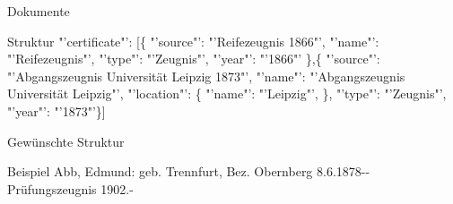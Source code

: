 \documentclass[12pt]{beamer}
\begin{document}
\begin{large}
\begin{frame}{Dokumente}
 \begin{block}{Struktur}
  \normalsize
  \hspace*{0.5cm} 
  "'certificate"': [\{
\newline 
\hspace*{1cm}"'source"': "'Reifezeugnis 1866"',
\newline 
\hspace*{1cm}"'name"': "'Reifezeugnis"',
\newline 
\hspace*{1cm}"'type"': "'Zeugnis"',
\newline 
\hspace*{1cm}"'year"': "'1866"'
\newline 
\hspace*{0.5cm}\},\{
\newline 
\hspace*{1cm}"'source"': "'Abgangszeugnis Universität Leipzig 1873"',
\newline 
\hspace*{1cm}"'name"': "'Abgangszeugnis Universität Leipzig"',
\newline 
\hspace*{1cm}"'location"': \{
\newline 
\hspace*{1cm}\hspace*{0.5cm}"'name"': "'Leipzig"',
\newline 
\hspace*{1cm}\},
\newline 
\hspace*{1cm}"'type"': "'Zeugnis"',
\newline 
\hspace*{1cm}"'year"': "'1873"'\}]
 \end{block} 
\end{frame}


\begin{frame}{Gewünschte Struktur}
 \begin{block}{Beispiel}
  \small
  Abb, Edmund: geb. Trennfurt, Bez. Obernberg 8.6.1878-{}- Prüfungszeugnis 1902.-
 \end{block}


\end{frame}
\end{large}
\end{document}
